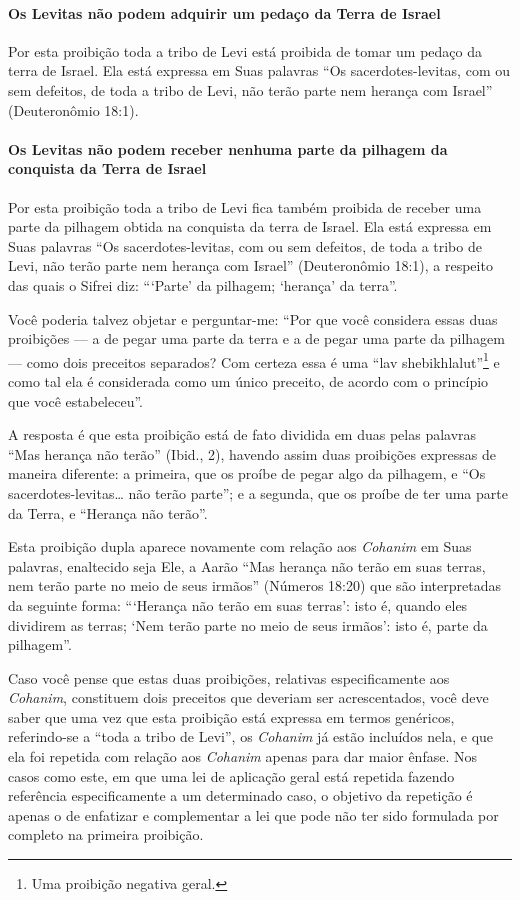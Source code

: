 \paragraph{Os Levitas não podem adquirir um pedaço da Terra de Israel}

Por esta proibição toda a tribo de Levi está proibida de tomar um pedaço
da terra de Israel. Ela está expressa em Suas palavras ``Os sacerdotes-levitas, com ou sem defeitos, de toda a tribo de Levi, não terão parte
nem herança com Israel'' (Deuteronômio 18:1).

\paragraph{Os Levitas não podem receber nenhuma parte da pilhagem da conquista
da Terra de Israel}

Por esta proibição toda a tribo de Levi fica também proibida de receber
uma parte da pilhagem obtida na conquista da terra de Israel. Ela está
expressa em Suas palavras ``Os sacerdotes-levitas, com ou sem defeitos,
de toda a tribo de Levi, não terão parte nem herança com Israel''
(Deuteronômio 18:1), a respeito das quais o Sifrei diz: ```Parte' da
pilhagem; `herança' da terra''.

Você poderia talvez objetar e perguntar-me: ``Por que você considera
essas duas proibições --- a de pegar uma parte da terra e a de pegar uma
parte da pilhagem --- como dois preceitos separados? Com certeza essa é
uma ``lav shebikhlalut''\footnote{Uma proibição negativa geral.} e como tal ela é
considerada como um único preceito, de acordo com o princípio que você
estabeleceu''.

A resposta é que esta proibição está de fato dividida em duas pelas
palavras ``Mas herança não terão'' (Ibid., 2), havendo assim duas
proibições expressas de maneira diferente: a primeira, que os proíbe de
pegar algo da pilhagem, e ``Os sacerdotes-levitas\ldots{} não terão parte'';
e a segunda, que os proíbe de ter uma parte da Terra, e ``Herança não
terão''.

Esta proibição dupla aparece novamente com relação aos \textit{Cohanim} em
Suas palavras, enaltecido seja Ele, a Aarão ``Mas herança não terão em
suas terras, nem terão parte no meio de seus irmãos'' (Números 18:20)
que são interpretadas da seguinte forma: ```Herança não terão em suas
terras': isto é, quando eles dividirem as terras; `Nem terão parte no
meio de seus irmãos': isto é, parte da pilhagem''.

Caso você pense que estas duas proibições, relativas especificamente
aos \textit{Cohanim}, constituem dois preceitos que deveriam ser
acrescentados, você deve saber que uma vez que esta proibição está
expressa em termos genéricos, referindo-se a ``toda a tribo de Levi'',
os \textit{Cohanim} já estão incluídos nela, e que ela foi repetida com
relação aos \textit{Cohanim} apenas para dar maior ênfase. Nos casos como
este, em que uma lei de aplicação geral está repetida fazendo referência
especificamente a um determinado caso, o objetivo da repetição é apenas
o de enfatizar e complementar a lei que pode não ter sido formulada por
completo na primeira proibição.

